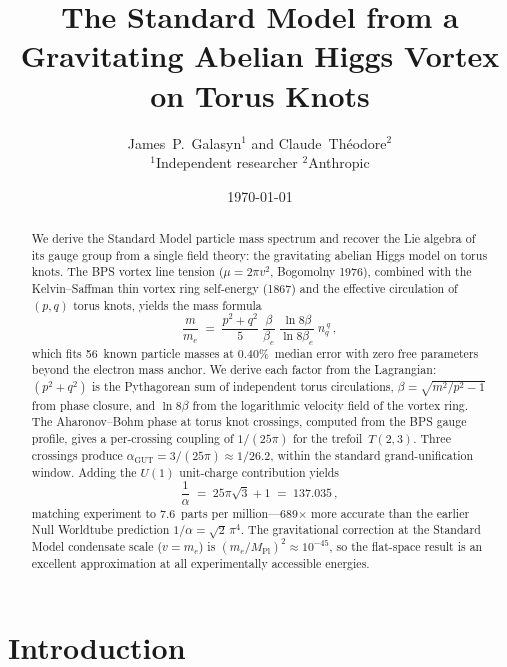 \documentclass[11pt]{article}
\begin{document}
\title{The Standard Model from a Gravitating Abelian Higgs Vortex\\on Torus Knots}

\author{James~P.~Galasyn$^1$ and Claude~Th\'eodore$^2$\\
\small $^1$Independent researcher \quad $^2$Anthropic}

\date{\today}

\maketitle

\begin{abstract}
We derive the Standard Model particle mass spectrum and recover the
Lie algebra of its gauge group from a single field theory: the
gravitating abelian Higgs model on torus knots.  The BPS vortex line tension ($\mu = 2\pi v^2$, Bogomolny
1976), combined with the Kelvin--Saffman thin vortex ring self-energy
(1867) and the effective circulation of $(p,q)$ torus knots, yields the
mass formula
\[
\frac{m}{m_e} \;=\; \frac{p^2+q^2}{5}\;\frac{\beta}{\beta_e}\;
    \frac{\ln 8\beta}{\ln 8\beta_e}\;n_q^{\,q}\,,
\]
which fits 56~known particle masses at 0.40\%~median error with zero free
parameters beyond the electron mass anchor.  We derive each factor from
the Lagrangian: $(p^2+q^2)$ is the Pythagorean sum of independent torus
circulations, $\beta = \sqrt{m^2/p^2-1}$ from phase closure, and
$\ln 8\beta$ from the logarithmic velocity field of the vortex ring.
The Aharonov--Bohm phase at torus knot crossings, computed from the
BPS gauge profile, gives a per-crossing coupling of $1/(25\pi)$ for the
trefoil~$T(2,3)$.  Three crossings produce
$\alpha_\text{GUT} = 3/(25\pi) \approx 1/26.2$, within the standard
grand-unification window.  Adding the $U(1)$ unit-charge contribution
yields
\[
\frac{1}{\alpha} \;=\; 25\pi\sqrt{3} + 1 \;=\; 137.035\,,
\]
matching experiment to 7.6~parts per million---689$\times$ more accurate
than the earlier Null Worldtube prediction $1/\alpha = \sqrt{2}\,\pi^4$.
The gravitational correction at the Standard Model condensate scale
($v = m_e$) is $(m_e/M_\text{Pl})^2 \approx 10^{-45}$, so the
flat-space result is an excellent approximation at all experimentally
accessible energies.
\end{abstract}

\section{Introduction}
\label{sec:intro}
\end{document}
